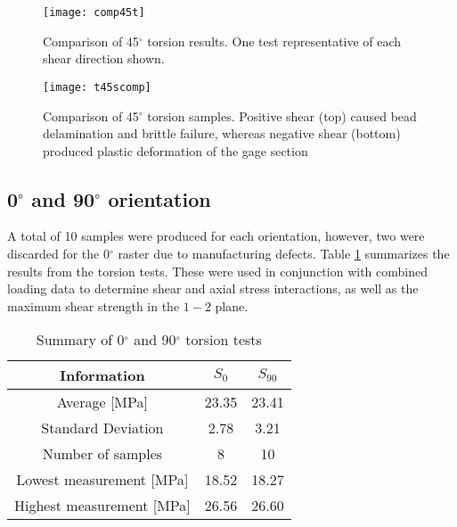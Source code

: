 \documentclass[main.tex]{subfiles}
\begin{document}
\begin{figure}[!htbp]
	\center
	\texttt{[image: comp45t]}
	\captionsetup{justification=centering} %
	\caption[Comparison of 45$^\circ$ torsion results]{Comparison of 45$^\circ$ torsion results. One test representative of each shear direction shown.} \label{fig:45comp}
\end{figure}

\begin{figure}[!htbp]
	\center
	\texttt{[image: t45scomp]}
	\captionsetup{justification=centering} %
	\caption[Comparison of 45$^\circ$ torsion results]{Comparison of 45$^\circ$ torsion samples. Positive shear (top) caused bead delamination and brittle failure, whereas negative shear (bottom) produced plastic deformation of the gage section} \label{fig:45scomp}
\end{figure}
  
\pagebreak
\subsection{0$^\circ$ and 90$^\circ$ orientation} \label{ssec:090r}

A total of 10 samples were produced for each orientation, however, two were discarded for the 0$^\circ$ raster due to manufacturing defects. Table \ref{tab:tors090r} summarizes the results from the torsion tests. These were used in conjunction with combined loading data to determine shear and axial stress interactions, as well as the maximum shear strength in the $1-2$ plane.

\begin{table} [h]
	\centering
	\caption{Summary of 0$^\circ$ and 90$^\circ$ torsion tests}
\begin{tabular}{ c| c c } 
	\toprule
	\textbf{Information} & $S_{0}$ & $S_{90}$\\
	\midrule
	Average [MPa] &23.35  & 23.41\\
	Standard Deviation &2.78 & 3.21\\
	Number of samples &8  & 10\\
	Lowest measurement [MPa] &18.52  & 18.27\\
	Highest measurement [MPa] &26.56 & 26.60\\
	\bottomrule
\end{tabular}
\label{tab:tors090r}
\end{table}
\end{document}
